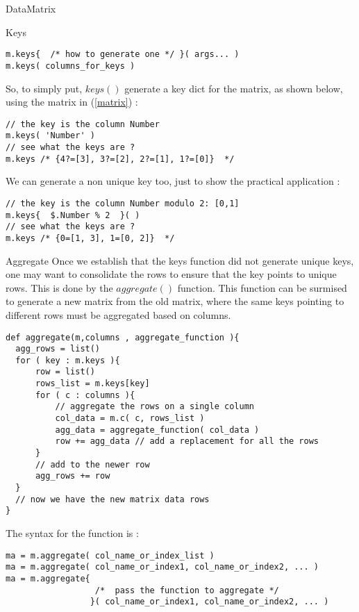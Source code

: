 \begin{section}{DataMatrix}
\begin{subsection}{Keys}
\begin{lstlisting}[style=JexlStyle]
m.keys{  /* how to generate one */ }( args... )
m.keys( columns_for_keys )
\end{lstlisting}

So, to simply put, $keys()$ generate a key dict for the matrix, as shown below, 
using the  matrix in (\ref{matrix}) :  

\begin{lstlisting}[style=JexlStyle]
// the key is the column Number
m.keys( 'Number' )
// see what the keys are ?
m.keys /* {4?=[3], 3?=[2], 2?=[1], 1?=[0]}  */
\end{lstlisting}

We can generate a non unique key too, just to show the practical application :

\begin{lstlisting}[style=JexlStyle]
// the key is the column Number modulo 2: [0,1]
m.keys{  $.Number % 2  }( )
// see what the keys are ?
m.keys /* {0=[1, 3], 1=[0, 2]}  */
\end{lstlisting}

\end{subsection}

\begin{subsection}{Aggregate}
Once we establish that the keys function did not generate unique keys, one may want to 
consolidate the rows to ensure that the key points to unique rows.
This is done by the $aggregate()$ function. This function can be surmised to
generate a new matrix from the old matrix, where the same keys pointing to different rows
must be aggregated based on columns.

\begin{lstlisting}[style=JexlStyle]
def aggregate(m,columns , aggregate_function ){
  agg_rows = list()
  for ( key : m.keys ){
      row = list()
      rows_list = m.keys[key]  
      for ( c : columns ){
          // aggregate the rows on a single column
          col_data = m.c( c, rows_list ) 
          agg_data = aggregate_function( col_data )
          row += agg_data // add a replacement for all the rows   
      }
      // add to the newer row
      agg_rows += row 
  }
  // now we have the new matrix data rows
}
\end{lstlisting}

The syntax for the function is :

\begin{lstlisting}[style=JexlStyle]
ma = m.aggregate( col_name_or_index_list )
ma = m.aggregate( col_name_or_index1, col_name_or_index2, ... )
ma = m.aggregate{ 
                  /*  pass the function to aggregate */  
                 }( col_name_or_index1, col_name_or_index2, ... )
\end{lstlisting}


\end{subsection}
\end{section}
